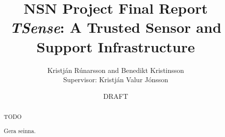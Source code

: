 \documentclass[10pt,titlepage,twoside,a4paper]{report}
\author{Kristj\'{a}n R\'{u}narsson and Benedikt Kristinsson\\Supervisor: Kristj\'{a}n Valur J\'{o}nsson}
\title{NSN Project Final Report\\\textit{TSense}: A Trusted Sensor and Support Infrastructure}
\date{DRAFT}
\begin{document}
\maketitle
\begin{titlepage}
\end{titlepage}
\newpage
\ \ \ \\
\newpage


\setcounter{page}{1}

\tableofcontents

\begin{abstract}
TODO
\end{abstract}

\renewcommand{\abstractname}{{\'{U}}tdr\'{a}ttur}
\begin{abstract}
Gera seinna.
\end{abstract}

\setcounter{page}{1}
\pagestyle{headings}








\end{document}
